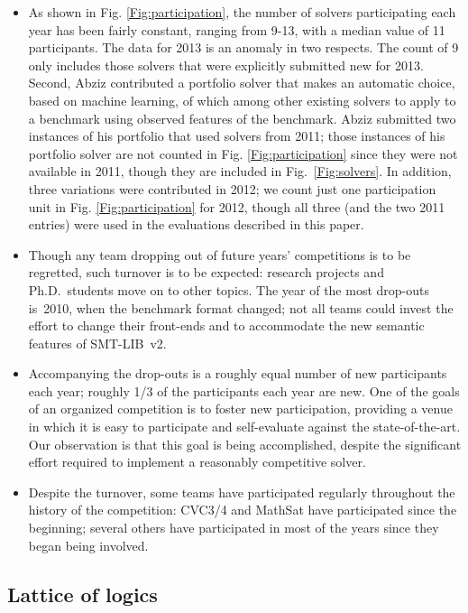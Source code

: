 \documentclass[smallcondensed]{svjour3}
\begin{document}
\begin{itemize}
\item As shown in Fig. \ref{Fig:participation}, the number of solvers participating each year has been fairly constant, ranging
from 9-13, with a median value of 11 participants. The data for 2013 is an anomaly in two respects. The count of 9 only includes those solvers that were explicitly submitted new for 2013. Second, Abziz contributed a portfolio solver that makes an automatic choice, based on machine learning, of which among other existing solvers to apply to a benchmark using observed features of the benchmark. Abziz submitted two instances of his portfolio that used solvers from 2011; those instances of his portfolio solver are not counted in 
Fig. \ref{Fig:participation} since they were not available in 2011, though they are included in Fig.~\ref{Fig:solvers}. In addition, three variations were contributed in 2012; we count just one participation unit in 
Fig. \ref{Fig:participation} for 2012, though all three (and the two 2011 entries) were used in the evaluations described in this paper.

\item Though any team dropping out of future years' competitions is to be regretted, such turnover is to be expected: research projects and Ph.D.\ students move on to other topics. The year of the most drop-outs is~2010, when the benchmark format changed; not all teams could invest the effort to change their front-ends and to accommodate the new semantic features of SMT-LIB~v2. 
\item Accompanying the drop-outs is a roughly equal number of new participants each year; roughly 1/3 of the participants each year are new. One of the goals of an organized competition is to foster new participation, providing a venue in which it is easy to participate and self-evaluate against the state-of-the-art. Our observation is that this goal is being accomplished, despite the significant effort required to implement a reasonably competitive solver. 
\item Despite the turnover, some teams have participated regularly throughout the history of the competition: CVC3/4 and MathSat have participated since the beginning; several others have participated in most of the years since they began being involved.
\end{itemize}



\subsection{Lattice of logics}
\label{Lattice}
\end{document}
